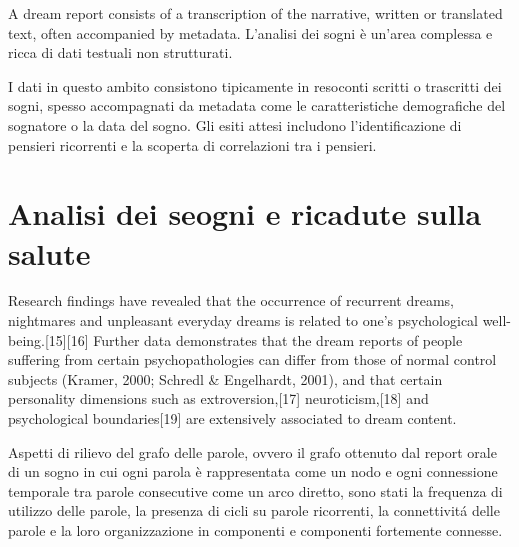 A dream report consists of a transcription of the narrative, written or translated text, often accompanied by metadata.
L'analisi dei sogni è un'area complessa e ricca di dati testuali non strutturati.

I dati in questo ambito consistono tipicamente in resoconti scritti o trascritti dei sogni, spesso accompagnati da
metadata come le caratteristiche demografiche del sognatore o la data del sogno. Gli esiti attesi includono
l'identificazione di pensieri ricorrenti e la scoperta di correlazioni tra i pensieri.

\section{Analisi dei seogni e ricadute sulla salute}


Research findings have revealed that the occurrence of recurrent dreams, nightmares and unpleasant everyday dreams is
related to one's psychological well-being.[15][16] Further data demonstrates that the dream reports of people suffering
from certain psychopathologies can differ from those of normal control subjects
(Kramer, 2000; Schredl \& Engelhardt, 2001), and that certain personality dimensions such as extroversion,[17]
neuroticism,[18] and psychological boundaries[19] are extensively associated to dream content.

Aspetti di rilievo del grafo delle parole, ovvero il grafo ottenuto dal report orale di un sogno in cui
ogni parola \`e rappresentata come un nodo e ogni connessione temporale tra parole consecutive come un arco diretto,
sono stati la frequenza di utilizzo delle parole, la presenza di cicli su parole ricorrenti, la connettivit\'a delle
parole e la loro organizzazione in componenti e componenti fortemente connesse. \newline